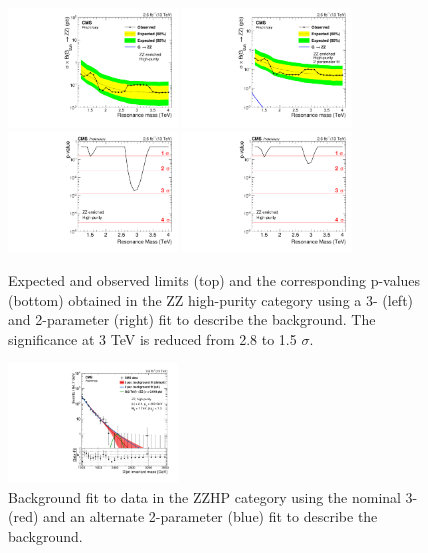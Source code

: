 \begin{figure}[h!]
\centering
\includegraphics[width=0.4\textwidth]{figures/analysis/search1/AN-15-211/limits/brazilianFlag_BulkZZ_ZZHP_13TeV.pdf}
\includegraphics[width=0.4\textwidth]{figures/analysis/search1/AN-15-211/limits/brazilianFlag_BulkZZ_ZZHP_2parFit__13TeV.pdf}\\
\includegraphics[width=0.4\textwidth]{figures/analysis/search1/AN-15-211/pvalues/pvalue_BulkZZinZZ_high_purity.pdf}
\includegraphics[width=0.4\textwidth]{figures/analysis/search1/AN-15-211/pvalues/pvalue_BulkZZinZZ_high_purity_2par.pdf}
\caption{Expected and observed limits (top) and the corresponding p-values (bottom) obtained in the ZZ high-purity category using a 3- (left) and 2-parameter (right) fit to describe the background. The significance at 3 TeV is reduced from 2.8 to 1.5 $\sigma$.}
\label{fig:searchI:Limits_ZZHP}
\end{figure}
\begin{figure}[h!]
\centering
\includegraphics[width=0.4\textwidth]{figures/analysis/search1/misc/CMS-PAS-EXO-15-002_Figure_004-e.pdf}
\caption{Background fit to data in the ZZHP category using the nominal 3- (red) and an alternate 2-parameter (blue) fit to describe the background.}
\label{fig:app:ZZHP2vs3p}
\end{figure}
